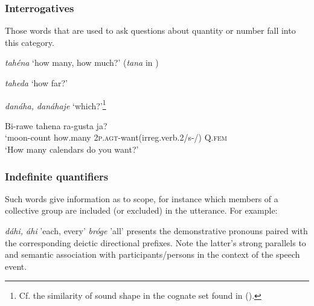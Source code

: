 \documentclass[output=paper]{LSP/langsci}
\begin{document}
\subsubsection{Interrogatives}

Those words that are used to ask questions about quantity or number fall into this category.  

\ea
\ea \textit{tahéna}  {\upshape `how many, how much?'       (\textit{tana} in \citealt{HamiltonIrvin1848})}

\ex \textit{taheda}   {\upshape `how far?'  }

\ex \textit{danáha, danáhaje}   {\upshape `which?'\footnote{Cf. the similarity of sound shape in the cognate set found in  (\citealt[455-457]{RoodTaylor1996}).}}
\z
\z

\ea  \gll Bi-rawe   tahena   ra-gusta         		 ja? 	\\			          		
`moon-count  how.many    2\textsc{p.agt}-want(irreg.verb.2/s-/) Q.\textsc{fem}	\\					
\glt `How many calendars do you want?'  
\z

\subsubsection{Indefinite quantifiers}  

Such words give information as to scope, for instance which members of a collective group are included (or excluded) in the utterance. For example:  

\ea
\ea \textit{dáhi, áhi} {\upshape 'each, every'}
\ex \textit{bróge}  {\upshape 'all'}
\z
\z
{} presents the demonstrative pronouns paired with the corresponding deictic directional prefixes.  Note the latter's strong parallels to and semantic association with  participants/persons in the context of the speech event.
\end{document}

